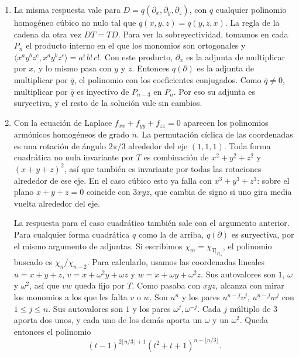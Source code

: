 \documentclass[11pt]{amsproc}
\begin{document}
\begin{enumerate}
  \item La misma respuesta vale para $D=q(\partial_x,\partial_y,\partial_z)$,
    con $q$ cualquier polinomio homogéneo cúbico no nulo tal que
    $q(x,y,z)=q(y,z,x)$. La regla de la cadena da otra vez $DT=TD$. Para ver
    la sobreyectividad, tomamos en cada $P_n$ el producto interno en el que
    los monomios son ortogonales y
    $\langle x^ay^bz^c,x^ay^bz^c\rangle=a!\,b!\,c!$. Con este producto,
    $\partial_x$ es la adjunta de multiplicar por $x$, y lo mismo pasa con
    $y$ y $z$. Entonces $q(\partial)$ es la adjunta de multiplicar por
    $\bar q$, el polinomio con los coeficientes conjugados. Como
    $\bar q\ne 0$, multiplicar por $\bar q$ es inyectivo de $P_{n-3}$ en
    $P_n$. Por eso su adjunta es suryectiva, y el resto de la solución vale
    sin cambios.

  \item Con la ecuación de Laplace $f_{xx}+f_{yy}+f_{zz}=0$ aparecen los
    polinomios armónicos homogéneos de grado $n$. La permutación cíclica de
    las coordenadas es una rotación de ángulo $2\pi/3$ alrededor del eje
    $(1,1,1)$. Toda forma cuadrática no nula invariante por $T$ es
    combinación de $x^2+y^2+z^2$ y $(x+y+z)^2$, así que también es invariante
    por todas las rotaciones alrededor de ese eje. En el caso cúbico esto ya
    falla con $x^3+y^3+z^3$: sobre el plano $x+y+z=0$ coincide con $3xyz$,
    que cambia de signo si uno gira media vuelta alrededor del eje.

    La respuesta para el caso cuadrático también sale con el argumento
    anterior. Para cualquier forma cuadrática $q$ como la de arriba,
    $q(\partial)$ es suryectiva, por el mismo argumento de adjuntas. Si
    escribimos $\chi_m=\chi_{T|_{P_m}}$, el polinomio buscado es
    $\chi_n/\chi_{n-2}$. Para calcularlo, usamos las coordenadas lineales
    $u=x+y+z$, $v=x+\omega^2y+\omega z$ y $w=x+\omega y+\omega^2z$. Sus
    autovalores son $1$, $\omega$ y $\omega^2$, así que $vw$ queda fijo por
    $T$. Como pasaba con $xyz$, alcanza con mirar los monomios a los que les
    falta $v$ o $w$. Son $u^n$ y los pares $u^{n-j}v^j$, $u^{n-j}w^j$ con
    $1\le j\le n$. Sus autovalores son $1$ y los pares
    $\omega^j,\omega^{-j}$. Cada $j$ múltiplo de $3$ aporta dos unos, y cada
    uno de los demás aporta un $\omega$ y un $\omega^2$. Queda entonces el
    polinomio
    \[
      (t-1)^{2\lfloor n/3\rfloor+1}
      (t^2+t+1)^{n-\lfloor n/3\rfloor}.
    \]
\end{enumerate}
\end{document}
